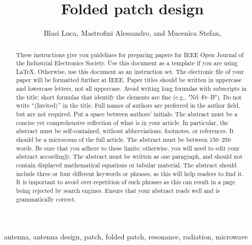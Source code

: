 \documentclass{ieeeojies}
\begin{document}
\title{Folded patch design}
\author{{Blasi Luca}, 
{Mastrofini Alessandro, and Mucenica Stefan},
}
\address[1]{National Institute of Standards and 
Technology, Boulder, CO 80305 USA (e-mail: author@boulder.nist.gov)}
\address[2]{Department of Physics, Colorado State University, Fort Collins, 
CO 80523 USA (e-mail: author@lamar.colostate.edu)}
\address[3]{Electrical Engineering Department, University of Colorado, Boulder, CO 
80309 USA}





\begin{abstract}
These instructions give you guidelines for preparing papers for 
IEEE Open Journal of the Industrial Electronics Society. Use this document as a template if you are 
using \LaTeX. Otherwise, use this document as an 
instruction set. The electronic file of your paper will be formatted further 
at IEEE. Paper titles should be written in uppercase and lowercase letters, 
not all uppercase. Avoid writing long formulas with subscripts in the title; 
short formulas that identify the elements are fine (e.g., "Nd--Fe--B"). Do 
not write ``(Invited)'' in the title. Full names of authors are preferred in 
the author field, but are not required. Put a space between authors' 
initials. The abstract must be a concise yet comprehensive reflection of 
what is in your article. In particular, the abstract must be self-contained, 
without abbreviations, footnotes, or references. It should be a microcosm of 
the full article. The abstract must be between 150--250 words. Be sure that 
you adhere to these limits; otherwise, you will need to edit your abstract 
accordingly. The abstract must be written as one paragraph, and should not 
contain displayed mathematical equations or tabular material. The abstract 
should include three or four different keywords or phrases, as this will 
help readers to find it. It is important to avoid over-repetition of such 
phrases as this can result in a page being rejected by search engines. 
Ensure that your abstract reads well and is grammatically correct.
\end{abstract}

\begin{keywords}
antenna, antenna design, patch, folded patch, resonance, radiation, microwave
\end{keywords}
\end{document}
